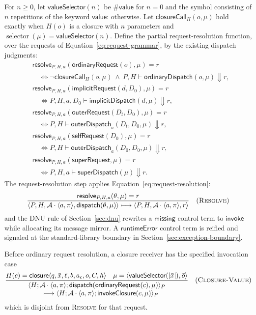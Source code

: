\documentclass[11pt]{article}
\numberwithin{equation}{section}
\newcommand{\kw}[1]{\ensuremath{\mathsf{#1}}}
\newcommand{\selector}{\mathop{\mathrm{selector}}}
\newcommand{\kws}[1]{\ensuremath{\mathsf{#1\mathord{:}}}}
\newcommand{\rulelabel}[1]{\textsc{#1}}
\begin{document}
For $n\geq0$, let $\mathsf{valueSelector}(n)$ be $\#\kw{value}$ for $n=0$
and the symbol consisting of $n$ repetitions of the keyword \kws{value}
otherwise.  Let $\mathsf{closureCall}_H(o,\mu)$ hold exactly when $H(o)$ is a
closure with $n$ parameters and
$\selector(\mu)=\mathsf{valueSelector}(n)$.  Define the partial
request-resolution function, over the requests of
Equation~\eqref{eq:request-grammar}, by the existing dispatch judgments:
\begin{equation}\label{eq:request-resolution}
\begin{aligned}
 &\mathsf{resolve}_{P,H,a}(\kw{ordinaryRequest}(o),\mu)=r\\[-1mm]
 &\quad\Longleftrightarrow
   \neg\mathsf{closureCall}_H(o,\mu)\ \land\
   P,H\vdash\mathsf{ordinaryDispatch}(o,\mu)\Downarrow r,\\
 &\mathsf{resolve}_{P,H,a}(\kw{implicitRequest}(d,D_0),\mu)=r\\[-1mm]
 &\quad\Longleftrightarrow
   P,H,a,D_0\vdash\mathsf{implicitDispatch}(d,\mu)\Downarrow r,\\
 &\mathsf{resolve}_{P,H,a}(\kw{outerRequest}(D_t,D_0),\mu)=r\\[-1mm]
 &\quad\Longleftrightarrow
   P,H\vdash\mathsf{outerDispatch}_a(D_t,D_0,\mu)\Downarrow r,\\
 &\mathsf{resolve}_{P,H,a}(\kw{selfRequest}(D_0),\mu)=r\\[-1mm]
 &\quad\Longleftrightarrow
   P,H\vdash\mathsf{outerDispatch}_a(D_0,D_0,\mu)\Downarrow r,\\
 &\mathsf{resolve}_{P,H,a}(\kw{superRequest},\mu)=r\\[-1mm]
 &\quad\Longleftrightarrow
   P,H,a\vdash\mathsf{superDispatch}(\mu)\Downarrow r.
\end{aligned}
\end{equation}
The request-resolution step applies Equation~\eqref{eq:request-resolution}:
\[
\dfrac{\mathsf{resolve}_{P,H,a}(\theta,\mu)=r}
 {\langle P,H,\mathcal A\cdot\langle a,\pi\rangle,
             \kw{dispatch}(\theta,\mu)\rangle
  \longmapsto
  \langle P,H,\mathcal A\cdot\langle a,\pi\rangle,r\rangle}
\quad(\rulelabel{Resolve})
\]
and the DNU rule of Section~\ref{sec:dnu} rewrites a $\kw{missing}$ control
term to $\kw{invoke}$ while allocating its message mirror.  A
$\kw{runtimeError}$ control term is reified and signaled at the standard-library
boundary in Section~\ref{sec:exception-boundary}.

Before ordinary request resolution, a closure receiver has the specified
invocation case
\[
\dfrac{H(c)=\kw{closure}\langle q,\bar x,\ell,b,a_c,o,C,h\rangle\quad
       \mu=\langle\mathsf{valueSelector}(|\bar x|),\bar o\rangle}
 {\begin{aligned}
  &\langle H;\mathcal A\cdot\langle a,\pi\rangle;
       \kw{dispatch}(\kw{ordinaryRequest}(c),\mu)\rangle_P\\[-1mm]
  &\qquad\longmapsto
   \langle H;\mathcal A\cdot\langle a,\pi\rangle;
       \kw{invokeClosure}(c,\mu)\rangle_P
  \end{aligned}}
\quad(\rulelabel{Closure-Value})
\]
which is disjoint from \rulelabel{Resolve} for that request.
\end{document}
